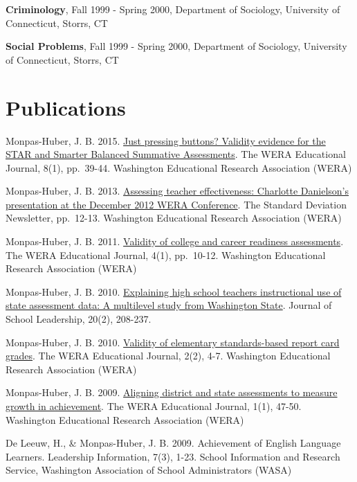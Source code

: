 \documentclass[
  letterpaper,
]{article}
\begin{document}
\textbf{Criminology}, Fall 1999 - Spring 2000, Department of Sociology,
University of Connecticut, Storrs, CT

\textbf{Social Problems}, Fall 1999 - Spring 2000, Department of
Sociology, University of Connecticut, Storrs, CT

\section{Publications}\label{publications}

Monpas-Huber, J. B. 2015.
\href{https://drive.google.com/file/d/1x8oKG5zFpYrCg2iZyhOD0OYvpk4IWJ_d/view?usp=sharing}{Just
pressing buttons? Validity evidence for the STAR and Smarter Balanced
Summative Assessments}. The WERA Educational Journal, 8(1), pp.~39-44.
Washington Educational Research Association (WERA)

Monpas-Huber, J. B. 2013.
\href{https://drive.google.com/file/d/1IPchvprztE25ap0rP4c5FhwPeNwTM83E/view?usp=sharing}{Assessing
teacher effectiveness: Charlotte Danielson's presentation at the
December 2012 WERA Conference}. The Standard Deviation Newsletter,
pp.~12-13. Washington Educational Research Association (WERA)

Monpas-Huber, J. B. 2011.
\href{https://drive.google.com/file/d/1WZL48M-R-UhAltJneSq7mOyfxNKFWjne/view?usp=sharing}{Validity
of college and career readiness assessments}. The WERA Educational
Journal, 4(1), pp.~10-12. Washington Educational Research Association
(WERA)

Monpas-Huber, J. B. 2010.
\href{https://journals.sagepub.com/doi/abs/10.1177/105268461002000205}{Explaining
high school teachers instructional use of state assessment data: A
multilevel study from Washington State}. Journal of School Leadership,
20(2), 208-237.

Monpas-Huber, J. B. 2010.
\href{https://drive.google.com/file/d/0B0FZn1UP3pDvSHJWQkpQSUJsaEU/view?usp=sharing}{Validity
of elementary standards-based report card grades}. The WERA Educational
Journal, 2(2), 4-7. Washington Educational Research Association (WERA)

Monpas-Huber, J. B. 2009.
\href{https://drive.google.com/file/d/1iKRckK7T0cA37V8gCdT5YRIyaPR6Mv9n/view?usp=sharing}{Aligning
district and state assessments to measure growth in achievement}. The
WERA Educational Journal, 1(1), 47-50. Washington Educational Research
Association (WERA)

De Leeuw, H., \& Monpas-Huber, J. B. 2009. Achievement of English
Language Learners. Leadership Information, 7(3), 1-23. School
Information and Research Service, Washington Association of School
Administrators (WASA)
\end{document}

